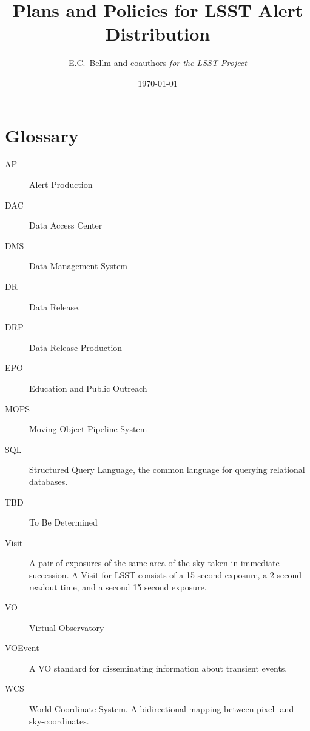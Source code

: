 \documentclass[DM,toc,lsstdraft]{lsstdoc}
\title{Plans and Policies for LSST Alert Distribution}
\author{
    E.C.~Bellm and coauthors
     \emph{for the LSST Project}
}
\date{\today}
\begin{document}
\maketitle











\section{Glossary}\label{sec:glossary}

\begin{description}
\item[AP] Alert Production
\item[DAC] Data Access Center
\item[DMS] Data Management System
\item[DR] Data Release.
\item[DRP] Data Release Production
\item[EPO] Education and Public Outreach
\item[MOPS] Moving Object Pipeline System
\item[SQL] Structured Query Language, the common language for querying relational databases.
\item[TBD] To Be Determined
\item[Visit] A pair of exposures of the same area of the sky taken in immediate
succession.  A Visit for LSST consists of a 15 second exposure, a 2
second readout time, and a second 15 second exposure.
\item[VO] Virtual Observatory
\item[VOEvent] A VO standard for disseminating information about transient events.
\item[WCS] World Coordinate System.  A bidirectional mapping between pixel- and sky-coordinates.
\end{description}

\clearpage


\end{document}
